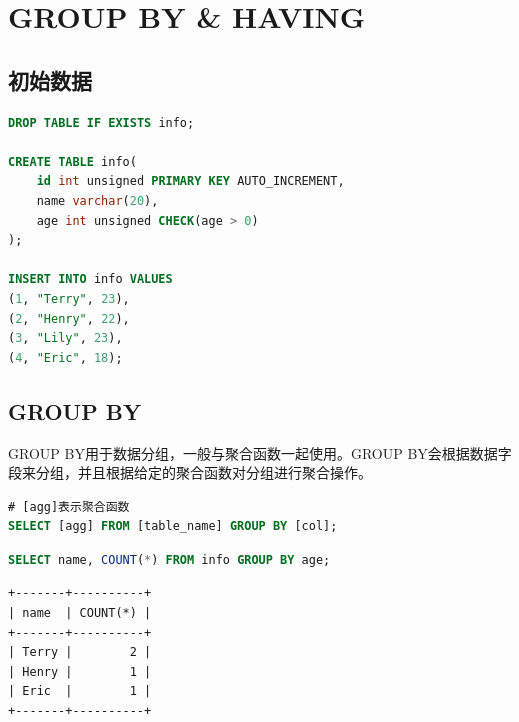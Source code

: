 \documentclass[12pt, openany, oneside]{book}
\begin{document}
\newpage

\chapter{GROUP BY \& HAVING}

\section{初始数据}


\begin{lstlisting}[language=SQL]
DROP TABLE IF EXISTS info;

CREATE TABLE info(
    id int unsigned PRIMARY KEY AUTO_INCREMENT,
    name varchar(20),
    age int unsigned CHECK(age > 0)
);

INSERT INTO info VALUES
(1, "Terry", 23),
(2, "Henry", 22),
(3, "Lily", 23),
(4, "Eric", 18);
\end{lstlisting}

\vspace{0.5cm}

\section{GROUP BY}

GROUP BY用于数据分组，一般与聚合函数一起使用。GROUP BY会根据数据字段来分组，并且根据给定的聚合函数对分组进行聚合操作。

\vspace{-0.5cm}

\begin{lstlisting}[language=SQL]
# [agg]表示聚合函数
SELECT [agg] FROM [table_name] GROUP BY [col];
\end{lstlisting}

\vspace{0.5cm}


\begin{lstlisting}[language=SQL]
SELECT name, COUNT(*) FROM info GROUP BY age;
\end{lstlisting}

\begin{tcolorbox}
\begin{verbatim}
+-------+----------+
| name  | COUNT(*) |
+-------+----------+
| Terry |        2 |
| Henry |        1 |
| Eric  |        1 |
+-------+----------+
	\end{verbatim}
\end{tcolorbox}
\end{document}
